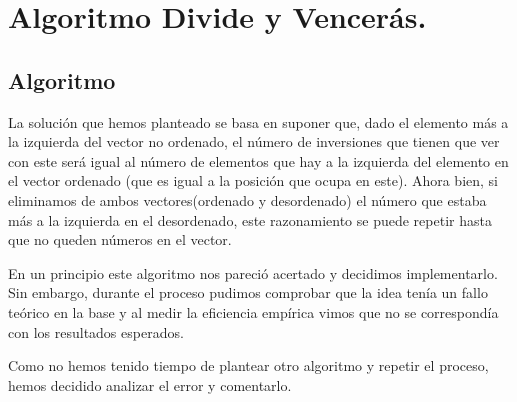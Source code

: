 \documentclass[a4paper, 11pt]{article}
\begin{document}
\section{Algoritmo Divide y Vencerás.}
\subsection{Algoritmo}
	
	La solución que hemos planteado se basa en suponer que, dado el elemento más a la izquierda del vector no ordenado, el número de inversiones que tienen que ver con este será igual al número de elementos que hay a la izquierda del elemento en el vector ordenado (que es igual a la posición que ocupa en este). Ahora bien, si eliminamos de ambos vectores(ordenado y desordenado) el número que estaba más a la izquierda en el desordenado, este razonamiento se puede repetir hasta que no queden números en el vector.
	
	En un principio este algoritmo nos pareció acertado y decidimos implementarlo. Sin embargo, durante el proceso pudimos comprobar que la idea tenía un fallo teórico en la base y al medir la eficiencia empírica vimos que no se correspondía con los resultados esperados.
	
	Como no hemos tenido tiempo de plantear otro algoritmo y repetir el proceso, hemos decidido analizar el error y comentarlo.
\end{document}
